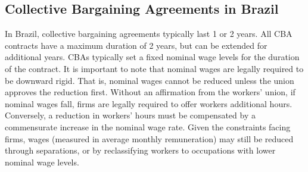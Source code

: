 \documentclass[12pt]{article}
\begin{document}

		\subsection{Collective Bargaining Agreements in Brazil}
		In Brazil, collective bargaining agreements typically last 1 or 2 years. All CBA contracts have a maximum duration of 2 years, but can be extended for additional years. \cite{lagosLaborMarketInstitutions2021} CBAs typically set a fixed nominal wage levels for the duration of the contract. It is important to note that nominal wages are legally required to be downward rigid. That is, nominal wages cannot be reduced unless the union approves the reduction first. Without an affirmation from the workers' union, if nominal wages fall, firms are legally required to offer workers additional hours. Conversely, a reduction in workers' hours must be compensated by a commensurate increase in the nominal wage rate. \cite{EnglishTranslationConsolidation2010}
		Given the constraints facing firms, wages (measured in average monthly remuneration) may still be reduced through separations, or by reclassifying workers to occupations with lower nominal wage levels. 
\end{document}
